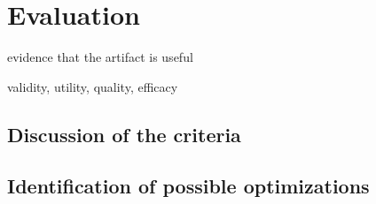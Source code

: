 \chapter{Evaluation}

evidence that the artifact is useful

validity, utility, quality, efficacy 

\section{Discussion of the criteria} \label{sec:Discussion}

\section{Identification of possible optimizations} \label{sec:Optimizations}